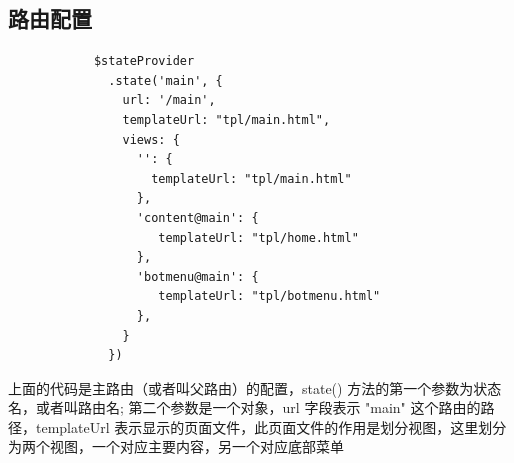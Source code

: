 \documentclass[UTF8]{ctexbook}
\begin{document}
    \subsection{路由配置}
      \label{subsec:路由配置}
        \begin{lstlisting}
            $stateProvider
              .state('main', {
                url: '/main',
                templateUrl: "tpl/main.html",
                views: {
                  '': {
                    templateUrl: "tpl/main.html"
                  },
                  'content@main': {
                     templateUrl: "tpl/home.html"
                  },
                  'botmenu@main': {
                     templateUrl: "tpl/botmenu.html"
                  },
                }
              })
          \end{lstlisting}
          上面的代码是主路由（或者叫父路由）的配置，state() 方法的第一个参数为状态名，或者叫路由名; 第二个参数是一个对象，url 字段表示 "main" 这个路由的路径，templateUrl 表示显示的页面文件，此页面文件的作用是划分视图，这里划分为两个视图，一个对应主要内容，另一个对应底部菜单
\end{document}
